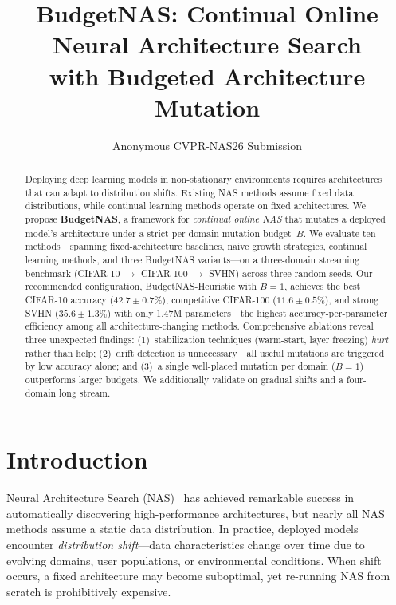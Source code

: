 \documentclass[10pt,twocolumn,letterpaper]{article}
\title{BudgetNAS: Continual Online Neural Architecture Search\\with Budgeted Architecture Mutation}
\author{
Anonymous CVPR-NAS26 Submission
}
\begin{document}
\maketitle

\begin{abstract}
Deploying deep learning models in non-stationary environments requires architectures that can adapt to distribution shifts. Existing NAS methods assume fixed data distributions, while continual learning methods operate on fixed architectures. We propose \textbf{BudgetNAS}, a framework for \emph{continual online NAS} that mutates a deployed model's architecture under a strict per-domain mutation budget~$B$. We evaluate ten methods---spanning fixed-architecture baselines, naive growth strategies, continual learning methods, and three BudgetNAS variants---on a three-domain streaming benchmark (CIFAR-10 $\rightarrow$ CIFAR-100 $\rightarrow$ SVHN) across three random seeds. Our recommended configuration, BudgetNAS-Heuristic with $B{=}1$, achieves the best CIFAR-10 accuracy ($42.7{\pm}0.7\%$), competitive CIFAR-100 ($11.6{\pm}0.5\%$), and strong SVHN ($35.6{\pm}1.3\%$) with only 1.47M parameters---the highest accuracy-per-parameter efficiency among all architecture-changing methods. Comprehensive ablations reveal three unexpected findings: (1)~stabilization techniques (warm-start, layer freezing) \emph{hurt} rather than help; (2)~drift detection is unnecessary---all useful mutations are triggered by low accuracy alone; and (3)~a single well-placed mutation per domain ($B{=}1$) outperforms larger budgets. We additionally validate on gradual shifts and a four-domain long stream.
\end{abstract}

\section{Introduction}
\label{sec:intro}

Neural Architecture Search (NAS)~\cite{zoph2017neural,elsken2019survey} has achieved remarkable success in automatically discovering high-performance architectures, but nearly all NAS methods assume a static data distribution. In practice, deployed models encounter \emph{distribution shift}---data characteristics change over time due to evolving domains, user populations, or environmental conditions. When shift occurs, a fixed architecture may become suboptimal, yet re-running NAS from scratch is prohibitively expensive.
\end{document}
